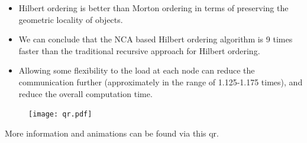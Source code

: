 \documentclass[a0,landscape]{a0poster}
\begin{document}
\begin{multicols}{4}
\begin{itemize}
\item Hilbert ordering is better than Morton ordering in terms of preserving the geometric locality of objects. 
\item We can conclude that the NCA based Hilbert ordering algorithm is 9 times faster than the traditional recursive approach for Hilbert ordering. 
\item Allowing some flexibility to the load at each node can reduce the communication further  (approximately in the range of 1.125-1.175 times), and reduce the overall computation time. 
\end{itemize}

\begin{figure}
\centering
\texttt{[image: qr.pdf]}
\end{figure}
More information and animations can be found via this qr. 


\color{DarkSlateGray} %






\nocite{*} %


% 


\end{multicols}
\end{document}
